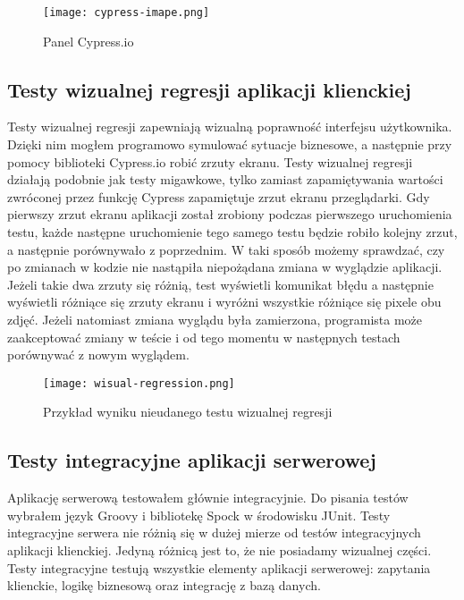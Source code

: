 \begin{figure}
    \texttt{[image: cypress-imape.png]}
    \caption{Panel Cypress.io} \label{fig-cypress}
\end{figure}

\subsection{Testy wizualnej regresji aplikacji klienckiej}
Testy wizualnej regresji zapewniają wizualną poprawność interfejsu użytkownika. Dzięki nim mogłem programowo symulować sytuacje biznesowe, a następnie przy pomocy biblioteki Cypress.io robić zrzuty ekranu. Testy wizualnej regresji działają podobnie jak testy migawkowe, tylko zamiast zapamiętywania wartości zwróconej przez funkcję Cypress zapamiętuje zrzut ekranu przeglądarki. Gdy pierwszy zrzut ekranu aplikacji został zrobiony podczas pierwszego uruchomienia testu, każde następne uruchomienie tego samego testu będzie robiło kolejny zrzut, a następnie porównywało z poprzednim. W taki sposób możemy sprawdzać, czy po zmianach w kodzie nie nastąpiła niepożądana zmiana w wyglądzie aplikacji. Jeżeli takie dwa zrzuty się różnią, test wyświetli komunikat błędu a następnie wyświetli różniące się zrzuty ekranu i wyróżni wszystkie różniące się pixele obu zdjęć. Jeżeli natomiast zmiana wyglądu była zamierzona, programista może zaakceptować zmiany w teście i od tego momentu w następnych testach porównywać z nowym wyglądem.

\begin{figure}
    \texttt{[image: wisual-regression.png]}
    \caption{Przykład wyniku nieudanego testu wizualnej regresji} \label{fig-cypress-vr}
\end{figure}


\subsection{Testy integracyjne aplikacji serwerowej}
Aplikację serwerową testowałem głównie integracyjnie. Do pisania testów wybrałem język Groovy i bibliotekę Spock w środowisku JUnit. Testy integracyjne serwera nie różnią się w dużej mierze od testów integracyjnych aplikacji klienckiej. Jedyną różnicą jest to, że nie posiadamy wizualnej części. Testy integracyjne testują wszystkie elementy aplikacji serwerowej: zapytania klienckie, logikę biznesową oraz integrację z bazą danych.
